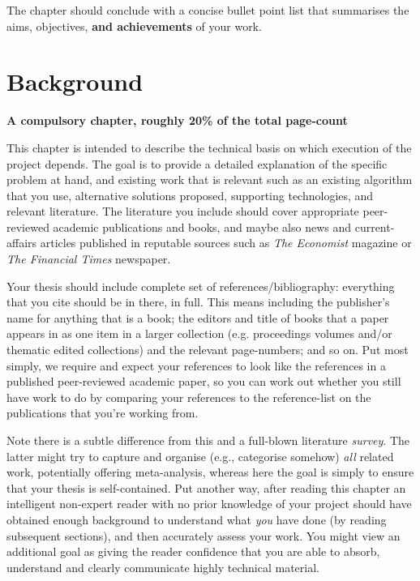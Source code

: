\documentclass[ %
                    author={Daniel Page},
                supervisor={Dr. Andrew Calway},
                    degree={MSc},
                     title={Some Structural Guidelines for Data Science MSc Theses, Including Those With Long Titles that Run Across Multiple Lines on the Front Page},
                  subtitle={And those including an optional subtitle too, for good measure},
                      type={},
                      year={2021}]{dissertation}
\begin{document}
The chapter should conclude with a concise bullet point list that 
summarises the aims, objectives, {\bf and achievements}\/ of your work. 


\chapter{Background}
\label{chap:background}

{\bf A compulsory chapter, roughly 20\% of the total page-count}
\vspace{1cm} 

\noindent
This chapter is intended to describe the technical basis on which execution
of the project depends.  The goal is to provide a detailed explanation of
the specific problem at hand, and existing work that is relevant such as an
existing algorithm that you use, alternative solutions proposed, supporting
technologies, and relevant literature. The literature you include should cover 
appropriate peer-reviewed academic publications and books, and maybe also 
news and current-affairs articles published in reputable sources such as 
{\em The Economist} magazine or {\em The Financial Times} newspaper. 

Your thesis should include complete set of references/bibliography: everything that you cite should be in there, in full. This means including the publisher's name for anything that is a book; the editors and title of books that a paper appears in as one item in a larger collection (e.g. proceedings volumes and/or thematic edited collections) and the relevant page-numbers; and so on. Put most simply, we require and expect your references to look like the references in a published peer-reviewed academic paper, so you can work out whether you still have work to do by comparing your references to the reference-list on the publications that you're working from. 

Note there is a subtle difference from
this and a full-blown literature {\em survey}.  The latter might try
to capture and organise (e.g., categorise somehow) {\em all}\/ related work,
potentially offering meta-analysis, whereas here the goal is simply to
ensure that your thesis is self-contained.  Put another way, after reading 
this chapter an intelligent non-expert reader with no prior knowledge of your project should have obtained enough background to 
understand what {\em you}\/ have done (by reading subsequent sections), and then 
accurately assess your work.  You might view an additional goal as giving 
the reader confidence that you are able to absorb, understand and clearly 
communicate highly technical material.
\end{document}
